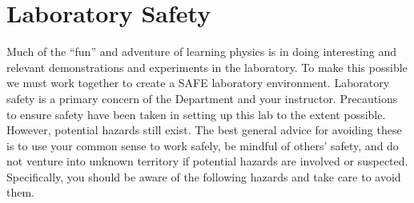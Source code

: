  
\chapter{Laboratory Safety}
Much of the ``fun'' and adventure of learning physics is in doing interesting and relevant demonstrations and experiments in the laboratory. To make this possible we must work together to create a SAFE laboratory environment. Laboratory safety is a primary concern of the Department and your instructor. Precautions to ensure safety have been taken in setting up this lab to the extent possible. However, potential hazards still exist. The best general advice for avoiding these is to use your common sense to work safely, be mindful of others' safety, and do not venture into unknown territory if potential hazards are involved or suspected. Specifically, you should be aware of the following hazards and take care to avoid them.

